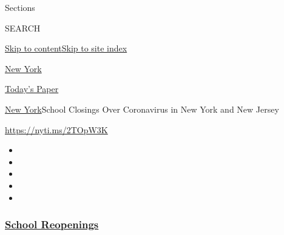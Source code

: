 Sections

SEARCH

\protect\hyperlink{site-content}{Skip to
content}\protect\hyperlink{site-index}{Skip to site index}

\href{https://www.nytimes3xbfgragh.onion/section/nyregion}{New York}

\href{https://myaccount.nytimes3xbfgragh.onion/auth/login?response_type=cookie\&client_id=vi}{}

\href{https://www.nytimes3xbfgragh.onion/section/todayspaper}{Today's
Paper}

\href{/section/nyregion}{New York}\textbar{}School Closings Over
Coronavirus in New York and New Jersey

\url{https://nyti.ms/2TOpW3K}

\begin{itemize}
\item
\item
\item
\item
\item
\end{itemize}

\hypertarget{school-reopenings}{%
\subsubsection{\texorpdfstring{\href{https://www.nytimes3xbfgragh.onion/spotlight/schools-reopening?name=styln-coronavirus-schools-reopening\&region=TOP_BANNER\&block=storyline_menu_recirc\&action=click\&pgtype=Interactive\&impression_id=f07eaa90-efba-11ea-9794-7776d1fd3dae\&variant=undefined}{School
Reopenings}}{School Reopenings}}\label{school-reopenings}}

